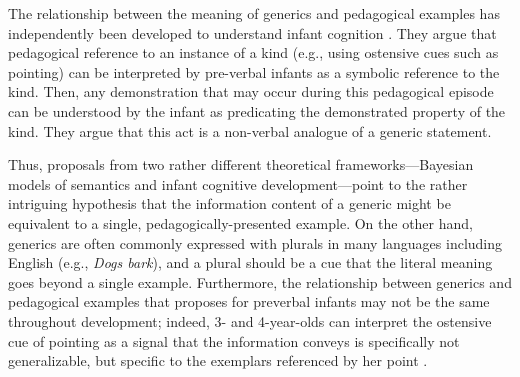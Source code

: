 \documentclass[10pt,letterpaper]{article}
\newcommand{\soph}[1]{\textcolor{Green}{[sb: #1]}}
\begin{document}
The relationship between the meaning of generics and pedagogical examples has independently been developed to understand infant cognition \cite{csibra2015nonverbal}.
They argue that pedagogical reference to an instance of a kind (e.g., using ostensive cues such as pointing) can be interpreted by pre-verbal infants as a symbolic reference to the kind.  
Then, any demonstration that may occur during this pedagogical episode can be understood by the infant as predicating the demonstrated property of the kind.
They argue that this act is a non-verbal analogue of a generic statement.

Thus, proposals from two rather different theoretical frameworks---Bayesian models of semantics and infant cognitive development---point to the rather intriguing hypothesis that the information content of a generic might be equivalent to a single, pedagogically-presented example.
On the other hand, generics are often commonly expressed with plurals in many languages including English (e.g., \emph{Dogs bark}), and a plural should be a cue that the literal meaning goes beyond a single example.
Furthermore, the relationship between generics and pedagogical examples that  proposes for preverbal infants may not be the same throughout development; indeed, 3- and 4-year-olds can interpret the ostensive cue of pointing as a signal that the information conveys is specifically not generalizable, but specific to the exemplars referenced by her point \cite{meyer2013pointing}.

\end{document}

